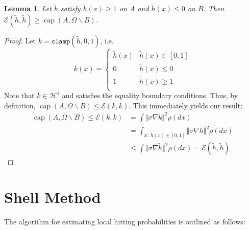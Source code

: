 \documentclass[12pt, nofootinbib,english, amsmath, amssymb, aps, priprint, graphicx,floatfix]{revtex4-1}
\newtheorem{lemma}{Lemma}
\theoremstyle{plain}
\theoremstyle{definition}
\theoremstyle{plain}
\newcommand{\capac}[2]{\ensuremath{\operatorname{cap}}(#1,#2)}
\begin{document}
\begin{lemma} \label{lem:inequalityboundaryvar} Let $\tilde h$ satisfy $\tilde h(x)\geq 1$ on $A$ and $\tilde h(x)\leq 0$ on $B$.  Then $\mathscr{E}(\tilde h,\tilde h) \geq \capac{A}{\Omega \backslash B}$.
\end{lemma}
\begin{proof}
Let $k=\mathtt{clamp}(\tilde h,0,1)$, i.e.
\[
k(x)=
\begin{cases}
\tilde h(x) & \tilde h(x)\in[0,1] \\
0 & \tilde h(x)\leq 0 \\
1 & \tilde h(x)\geq 1 \\
\end{cases}
\]  
Note that $k\in \mathcal{H}^1$ and satisfies the equality boundary conditions.  Thus, by definition, $\capac{A}{\Omega \backslash B} \leq \mathscr{E}(k,k)$.  This immediately yields our result:
\begin{align*}
\capac{A}{\Omega \backslash B} \leq \mathscr{E}(k,k) &= \int \Vert \sigma \nabla k \Vert^2 \rho(dx) \\
    &=\int_{x:\ \tilde h(x)\in[0,1]} \Vert \sigma \nabla \tilde h \Vert^2 \rho(dx) \\
    &\leq \int \Vert \sigma \nabla \tilde h \Vert^2 \rho(dx) = \mathscr{E}(\tilde h,\tilde h)
\end{align*}


\end{proof}

%
%
%
%
%
%
%
%
%






\section{Shell Method}
\label{sec:shell_method}

The algorithm for estimating local hitting probabilities is outlined as follows:
\end{document}
